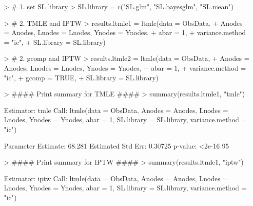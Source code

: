 \documentclass[answers]{exam}
\begin{document}
\begin{solution}
\begin{Schunk}
\begin{Sinput}
> # 1. set SL library
> SL.library = c("SL.glm", "SL.bayesglm", "SL.mean")
\end{Sinput}
\end{Schunk}
\begin{Schunk}
\begin{Sinput}
> # 2. TMLE and IPTW
> results.ltmle1 = ltmle(data = ObsData, 
+                        Anodes = Anodes, Lnodes = Lnodes, Ynodes = Ynodes, 
+                        abar = 1, 
+                        variance.method = "ic",
+                        SL.library = SL.library)
\end{Sinput}
\end{Schunk}
\begin{Schunk}
\begin{Sinput}
> # 2. gcomp and IPTW
> results.ltmle2 = ltmle(data = ObsData, 
+                        Anodes = Anodes, Lnodes = Lnodes, Ynodes = Ynodes, 
+                        abar = 1, 
+                        variance.method = "ic", 
+                        gcomp = TRUE,
+                        SL.library = SL.library)
\end{Sinput}
\end{Schunk}
\begin{Schunk}
\begin{Sinput}
> #### Print summary for TMLE ####
> summary(results.ltmle1, "tmle")
\end{Sinput}
\begin{Soutput}
Estimator:  tmle 
Call:
ltmle(data = ObsData, Anodes = Anodes, Lnodes = Lnodes, Ynodes = Ynodes, 
    abar = 1, SL.library = SL.library, variance.method = "ic")

   Parameter Estimate:  68.281 
    Estimated Std Err:  0.30725 
              p-value:  <2e-16 
    95%
\end{Soutput}
\end{Schunk}
\begin{Schunk}
\begin{Sinput}
> #### Print summary for IPTW ####
> summary(results.ltmle1, "iptw")
\end{Sinput}
\begin{Soutput}
Estimator:  iptw 
Call:
ltmle(data = ObsData, Anodes = Anodes, Lnodes = Lnodes, Ynodes = Ynodes, 
    abar = 1, SL.library = SL.library, variance.method = "ic")


\end{Soutput}
\end{Schunk}
\end{solution}
\end{document}
